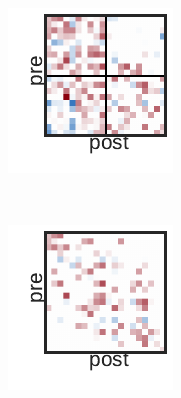 \begin{figure}[t!]
\begin{subfigure}[b]{1.10in}
  \end{subfigure}
  ~
  \hspace{-.1in}
  \begin{subfigure}[b]{1.10in}
    \centering
    \includegraphics[width=\textwidth]{figures/ch3/SBM-Distance.pdf}
  \end{subfigure}
  ~
  \hspace{-.1in}
  \begin{subfigure}[b]{1.10in}
    \centering
    \includegraphics[width=\textwidth]{figures/ch3/Distance-Distance.pdf}

\end{subfigure}
\end{figure}
